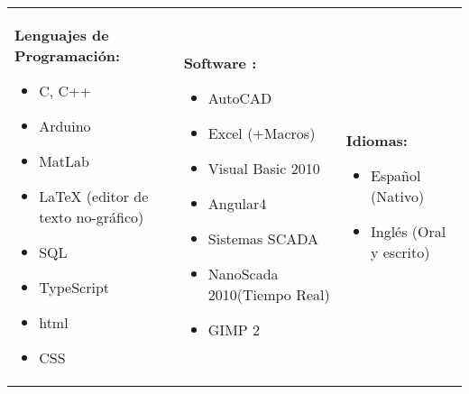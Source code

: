 \documentclass[11pt,a4paper,roman]{moderncv}        %
\begin{document}
	\begin{tabular}{l l l}
		
		\begin{minipage}[t]{0.4\textwidth}
			\textbf{Lenguajes de Programación:} 
			\begin{itemize}
				\item C, C++
				\item Arduino
				\item MatLab
				\item LaTeX {\tiny (editor de texto no-gráfico)}
				\item SQL
				\item TypeScript
				\item html
				\item CSS
			\end{itemize}
		\end{minipage}
	 &	
		\begin{minipage}[t]{0.35\textwidth}
 			\textbf{Software :} 
		 	\begin{itemize}
		 		\item AutoCAD
		 		\item Excel (+Macros)
		 		\item Visual Basic 2010
		 		\item Angular4
		 		\item Sistemas SCADA
		 		\item NanoScada 2010{\tiny \textregistered  (Tiempo Real)}
		 		\item GIMP 2
		 	\end{itemize}
	 \end{minipage}
	 &
	 \begin{minipage}[t]{0.25\textwidth}			 	
		 	\textbf{Idiomas:} 
		 	\begin{itemize}
		 		\item Español (Nativo)
		 		\item Inglés (Oral y escrito)
		 	\end{itemize}
	 \end{minipage}
	 \end{tabular}
	
\end{document}

